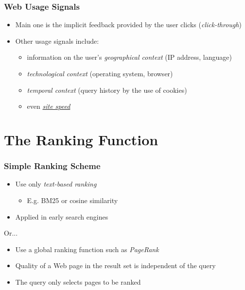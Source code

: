 \documentclass{beamer}
\begin{document}
\begin{frame}
    \frametitle{Web Usage Signals}
    \begin{itemize}
    \item Main one is the implicit feedback provided by the user clicks
        (\emph{click-through})
    \item Other usage signals include:
        \begin{itemize}
        \item information on the user's \emph{geographical context} (IP address,
            language)
        \item \emph{technological context} (operating system, browser)
        \item \emph{temporal context} (query history by the use of cookies)
        \item even \href{https://www.mattcutts.com/blog/site-speed/}{\emph{site speed}}
        \end{itemize}
    \end{itemize}
\end{frame}

\section{The Ranking Function}

\begin{frame}
    \frametitle{Simple Ranking Scheme}
    \begin{itemize}
    \item Use only \emph{text-based ranking}
        \begin{itemize}
        \item E.g. BM25 or cosine similarity
        \end{itemize}
    \item Applied in early search engines
    \end{itemize}
    Or...
    \begin{itemize}
    \item Use a global ranking function such as \emph{PageRank}
    \item Quality of a Web page in the result set is independent of the query
    \item The query only selects pages to be ranked
    \end{itemize}
\end{frame}
\end{document}
